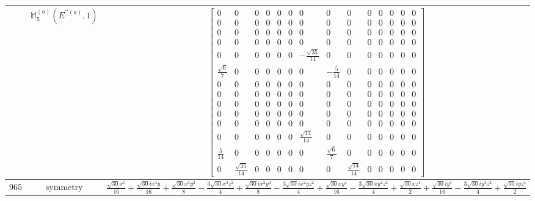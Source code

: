 \documentclass[fleqn,8pt,landscape]{jsarticle}
\begin{document}
\begin{longtable}{ccc}
$  $ & $ \mathbb{M}_{5}^{(a)}(E^{\prime\prime(a)},1) $ & $ \begin{bmatrix} 0 & 0 & 0 & 0 & 0 & 0 & 0 & 0 & 0 & 0 & 0 & 0 & 0 & 0 \\ 0 & 0 & 0 & 0 & 0 & 0 & 0 & 0 & 0 & 0 & 0 & 0 & 0 & 0 \\ 0 & 0 & 0 & 0 & 0 & 0 & 0 & 0 & 0 & 0 & 0 & 0 & 0 & 0 \\ 0 & 0 & 0 & 0 & 0 & 0 & 0 & 0 & 0 & 0 & 0 & 0 & 0 & 0 \\ 0 & 0 & 0 & 0 & 0 & 0 & - \frac{\sqrt{35}}{14} & 0 & 0 & 0 & 0 & 0 & 0 & 0 \\ \frac{\sqrt{6}}{7} & 0 & 0 & 0 & 0 & 0 & 0 & - \frac{5}{14} & 0 & 0 & 0 & 0 & 0 & 0 \\ 0 & 0 & 0 & 0 & 0 & 0 & 0 & 0 & 0 & 0 & 0 & 0 & 0 & 0 \\ 0 & 0 & 0 & 0 & 0 & 0 & 0 & 0 & 0 & 0 & 0 & 0 & 0 & 0 \\ 0 & 0 & 0 & 0 & 0 & 0 & 0 & 0 & 0 & 0 & 0 & 0 & 0 & 0 \\ 0 & 0 & 0 & 0 & 0 & 0 & 0 & 0 & 0 & 0 & 0 & 0 & 0 & 0 \\ 0 & 0 & 0 & 0 & 0 & 0 & 0 & 0 & 0 & 0 & 0 & 0 & 0 & 0 \\ 0 & 0 & 0 & 0 & 0 & 0 & \frac{\sqrt{14}}{14} & 0 & 0 & 0 & 0 & 0 & 0 & 0 \\ \frac{5}{14} & 0 & 0 & 0 & 0 & 0 & 0 & \frac{\sqrt{6}}{7} & 0 & 0 & 0 & 0 & 0 & 0 \\ 0 & \frac{\sqrt{35}}{14} & 0 & 0 & 0 & 0 & 0 & 0 & \frac{\sqrt{14}}{14} & 0 & 0 & 0 & 0 & 0 \end{bmatrix} $ \\ \hline
$ 965 $ & $ \text{symmetry} $ & $ \frac{\sqrt{30} x^{5}}{16} + \frac{\sqrt{30} i x^{4} y}{16} + \frac{\sqrt{30} x^{3} y^{2}}{8} - \frac{3 \sqrt{30} x^{3} z^{2}}{4} + \frac{\sqrt{30} i x^{2} y^{3}}{8} - \frac{3 \sqrt{30} i x^{2} y z^{2}}{4} + \frac{\sqrt{30} x y^{4}}{16} - \frac{3 \sqrt{30} x y^{2} z^{2}}{4} + \frac{\sqrt{30} x z^{4}}{2} + \frac{\sqrt{30} i y^{5}}{16} - \frac{3 \sqrt{30} i y^{3} z^{2}}{4} + \frac{\sqrt{30} i y z^{4}}{2} $ \\

\end{longtable}
\end{document}

